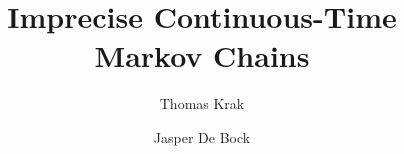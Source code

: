 \documentclass[10pt,a4paper]{paper}
\title{Imprecise Continuous-Time Markov Chains}
\author{Thomas Krak \and Jasper De Bock}
\theoremstyle{definition}
\begin{document}


\date{}
\maketitle
\end{document}

